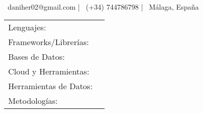 \documentclass[]{awesome-cv}
\begin{document}
    
\begin{center}
	  \\
	\vspace{2mm}
	{\hspace{0.8cm}\faEnvelope\ daniher02@gmail.com}  |  {\faMobile\ (+34) 744786798}  |  {\faMapMarker\ Málaga, España} 
\end{center}

\begin{cventries}
	\cventry
	{}
	{\def\arraystretch{1.15}{\begin{tabular}{ l l }
		Lenguajes:  & {\skill{ Python, R, SQL, Java, JavaScript, TypeScript, HTML, CSS}} \\
		Frameworks/Librerías:  & {\skill{ Django, FastAPI, Pandas, PySpark, Apache Airflow, React, Spring Boot}} \\
		Bases de Datos:  & {\skill{ PostgreSQL, MySQL, Snowflake, Redis, SQLite}} \\
		Cloud y Herramientas: & {\skill{ AWS (Lambda, SNS, EC2, S3), Azure, Docker, Git, Metabase}} \\
		Herramientas de Datos: & {\skill{ Airflow, Astronomer, Kafka, Celery, ETL Pipelines, MCP Servers}} \\
		Metodologías:  & {\skill{ Agile, Microservicios, DDD, Event Driven Architecture, Data Engineering}} \\
		\end{tabular}}}
	{}
	{}
	{}
\end{cventries}
\vspace{-7mm}
\end{document}
